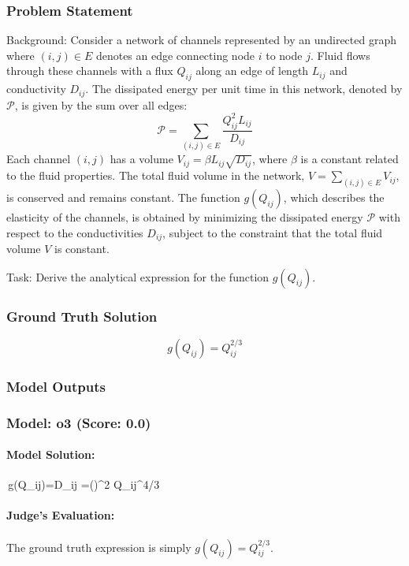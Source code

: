 \documentclass[10pt]{article}
\begin{document}
\subsubsection*{Problem Statement}
Background:
Consider a network of channels represented by an undirected graph where $(i,j) \in E$ denotes an edge connecting node $i$ to node $j$. Fluid flows through these channels with a flux $Q_{ij}$ along an edge of length $L_{ij}$ and conductivity $D_{ij}$. The dissipated energy per unit time in this network, denoted by $\mathcal{P}$, is given by the sum over all edges:
$$ \mathcal{P} = \sum_{(i,j)\in E}\frac{Q_{ij}^2 L_{ij}}{D_{ij}} $$
Each channel $(i,j)$ has a volume $V_{ij} = \beta L_{ij}\sqrt{D_{ij}}$, where $\beta$ is a constant related to the fluid properties. The total fluid volume in the network, $V = \sum_{(i,j)\in E} V_{ij}$, is conserved and remains constant. The function $g(Q_{ij})$, which describes the elasticity of the channels, is obtained by minimizing the dissipated energy $\mathcal{P}$ with respect to the conductivities $D_{ij}$, subject to the constraint that the total fluid volume $V$ is constant.

Task:
Derive the analytical expression for the function $g(Q_{ij})$.

\subsubsection*{Ground Truth Solution}
\[ \boxed{g(Q_{ij}) = Q_{ij}^{2/3}} \]

\subsubsection*{Model Outputs}
\subsubsection*{Model: o3 (Score: 0.0)}
\paragraph*{Model Solution:}
\,g(Q_{ij})=D_{ij}
       =\left(\right)^{2}
         Q_{ij}^{4/3}\,

\paragraph*{Judge's Evaluation:}

The ground truth expression is simply \( g(Q_{ij}) = Q_{ij}^{2/3} \).
\end{document}
